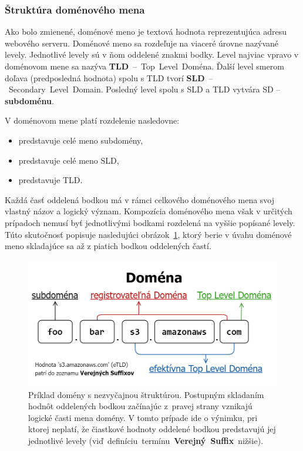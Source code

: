
\subsubsection{Štruktúra doménového mena}

Ako bolo zmienené, doménové meno je textová hodnota reprezentujúca adresu webového serveru.
Doménové meno sa rozdeľuje na viaceré úrovne nazývané levely. 
Jednotlivé levely sú v ňom oddelené znakmi bodky. 
Level najviac vpravo v doménovom mene sa nazýva \mbox{\textbf{TLD} -- Top Level Doména}. 
Ďalší level smerom doľava (predposledná hodnota) spolu s TLD tvorí \mbox{\textbf{SLD} -- Secondary Level Domain}.
Posledný level spolu s SLD a TLD vytvára SD -- \textbf{subdoménu}.

V doménovom mene  platí rozdelenie nasledovne: 
\begin{itemize}
    \item {} predstavuje celé meno subdomény,
    \item {} predstavuje celé meno SLD,
    \item {} predstavuje TLD.
\end{itemize}

Každá časť oddelená bodkou má v rámci celkového doménového mena svoj vlastný názov a logický význam.
Kompozícia doménového mena však v určitých prípadoch nemusí byť jednotlivými bodkami rozdelená na vyššie popísané levely. 
Túto skutočnosť popisuje nasledujúci \mbox{obrázok \ref{fig:domain-name-structure}}, \mbox{ktorý} berie v úvahu doménové meno skladajúce sa až z piatich bodkou oddelených častí.

\begin{figure}[htb]
\begin{center}
 \includegraphics[scale=0.45]{obrazky-figures/domain_name_structure.png}
 \caption{\centering Príklad domény s nezvyčajnou štruktúrou. Postupným skladaním hodnôt oddelených bodkou začínajúc \mbox{z pravej} strany vznikajú logické časti mena domény. V tomto prípade ide o výnimku, pri ktorej neplatí, že čiastkové hodnoty oddelené bodkou predstavujú jej jednotlivé levely \mbox{(viď definíciu termínu \textbf{Verejný Suffix} nižšie).}}
 \label{fig:domain-name-structure}
\end{center}
\end{figure}



